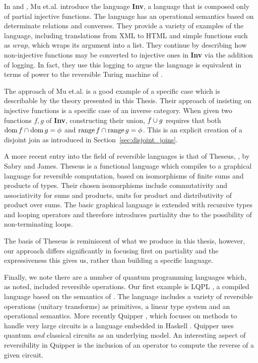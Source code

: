 In \cite{mu06bidirectional} and \cite{muetal04:injreversible}, Mu et.al. introduce the language
\textbf{Inv}, a language that is composed only of partial injective functions. The language has an
operational semantics based on determinate relations and converses. They provide a variety of examples of the
language, including translations from XML to HTML and simple functions such as $wrap$, which wraps
its argument into a list. They continue by describing how non-injective functions may be converted to
injective ones in \textbf{Inv} via the addition of logging. In fact, they use this logging to argue
the language is equivalent in terms of power to the reversible Turing machine of
\cite{bennett:1973reverse}.

The approach of Mu et.al. is a good example of a specific case which is describable by the theory
presented in this Thesis. Their approach of insisting on injective functions is a specific case of
an inverse category. When given two functions $f,g$ of \textbf{Inv}, constructing their union,
$f\cup g$ requires that both $\operatorname*{dom} f \cap \operatorname*{dom} g = \phi$ and $\operatorname*{range} f \cap \operatorname*{range} g =
\phi$. This is an explicit creation of a disjoint join as introduced in
Section~\ref{sec:disjoint_joins}.

A more recent entry into the field of reversible languages is that of Theseus,
\cite{james2014theseus}, by Sabry and James. Theseus is a functional language which compiles to
a graphical language \cite{james2013isomorphic,james2012information} for reversible computation, based on
isomorphisms of finite sums and products of types. Their chosen isomorphisms include commutativity
and associativity for sums and products, units for product and distributivity of product over
sums. The basic graphical language is extended with recursive types and looping operators and
therefore introduces partiality due to the possibility of non-terminating loops.

The basis of Theseus is reminiscent of what we produce in this thesis, however, our approach differs
significantly in focusing first on partiality and the expressiveness this gives us, rather than
building a specific language.


Finally, we note there are a number of quantum programming languages which, as noted, included
reversible operations. Our first example is LQPL \cite{giles2007}, a compiled language based on the
semantics of \cite{selinger04:qpl}. The language includes a variety of reversible operations
(unitary transforms) as primitives, a linear type system and an operational semantics. More recently
Quipper \cite{green2013introduction,green2013quipper}, which focuses on methods to handle very large
circuits is a language embedded in Haskell \cite{peyton2003:haskell98}. Quipper uses quantum
\emph{and} classical circuits as an underlying model. An interesting aspect of reversibility in
Quipper is the inclusion of an operator to compute the reverse of a given circuit.

